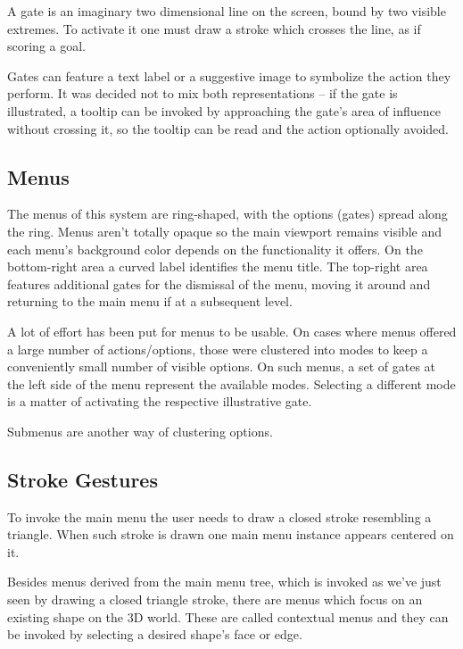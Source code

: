 A gate is an imaginary two dimensional line on the screen, bound by two visible extremes.
To activate it one must draw a stroke which crosses the line, as if scoring a goal.

Gates can feature a text label or a suggestive image to symbolize the action they perform.
It was decided not to mix both representations -- if the gate is illustrated, a tooltip can be invoked
by approaching the gate's area of influence without crossing it, so the tooltip can be read and the action optionally avoided.



\subsection{Menus}

The menus of this system are ring-shaped, with the options (gates) spread along the ring.
Menus aren't totally opaque so the main viewport remains visible and each menu's background color
depends on the functionality it offers.
On the bottom-right area a curved label identifies the menu title.
The top-right area features additional gates for the dismissal of the menu, moving it around and
returning to the main menu if at a subsequent level.

A lot of effort has been put for menus to be usable. On cases where menus offered a large number of actions/options,
those were clustered into modes to keep a conveniently small number of visible options.
On such menus, a set of gates at the left side of the menu represent the available modes.
Selecting a different mode is a matter of activating the respective illustrative gate.

Submenus are another way of clustering options. 




\subsection{Stroke Gestures}

To invoke the main menu the user needs to draw a closed stroke resembling a triangle.
When such stroke is drawn one main menu instance appears centered on it.


Besides menus derived from the main menu tree, which is invoked as we've just seen by drawing a closed triangle stroke,
there are menus which focus on an existing shape on the 3D world.
These are called contextual menus and they can be invoked by selecting a desired shape's face or edge.

